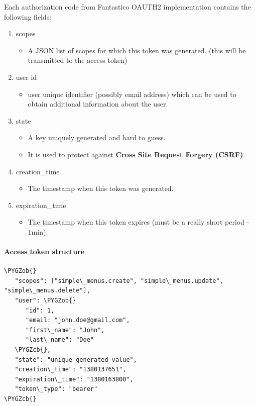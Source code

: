 \documentclass[letterpaper,10pt,english]{sphinxmanual}
\def\PYGZob{\char`\{}
\def\PYGZcb{\char`\}}
\begin{document}
Each authorization code from Fantastico OAUTH2 implementation contains the following fields:
\begin{enumerate}
\item {} 
scopes
\begin{itemize}
\item {} 
A JSON list of scopes for which this token was generated. (this will be transmitted to the access token)

\end{itemize}

\item {} 
user id
\begin{itemize}
\item {} 
user unique identifier (possibly email address) which can be used to obtain additional information about the user.

\end{itemize}

\item {} 
state
\begin{itemize}
\item {} 
A key uniquely generated and hard to guess.

\item {} 
It is used to protect against \textbf{Cross Site Request Forgery (CSRF)}.

\end{itemize}

\item {} 
creation\_time
\begin{itemize}
\item {} 
The timestamp when this token was generated.

\end{itemize}

\item {} 
expiration\_time
\begin{itemize}
\item {} 
The timestamp when this token expires (must be a really short period - 1min).

\end{itemize}

\end{enumerate}


\paragraph{Access token structure}
\label{features/oauth2/tokens_format:access-token-structure}
\begin{Verbatim}[commandchars=\\\{\}]
\PYGZob{}
   "scopes": ["simple\_menus.create", "simple\_menus.update", "simple\_menus.delete"],
   "user": \PYGZob{}
      "id": 1,
      "email: "john.doe@gmail.com",
      "first\_name": "John",
      "last\_name": "Doe"
   \PYGZcb{},
   "state": "unique generated value",
   "creation\_time": "1380137651",
   "expiration\_time": "1380163800",
   "token\_type": "bearer"
\PYGZcb{}
\end{Verbatim}
\end{document}
